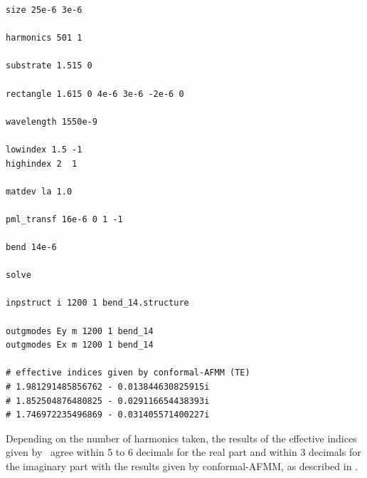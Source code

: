 \begin{lstlisting}
size 25e-6 3e-6

harmonics 501 1

substrate 1.515 0

rectangle 1.615 0 4e-6 3e-6 -2e-6 0

wavelength 1550e-9

lowindex 1.5 -1
highindex 2  1

matdev la 1.0

pml_transf 16e-6 0 1 -1

bend 14e-6

solve

inpstruct i 1200 1 bend_14.structure

outgmodes Ey m 1200 1 bend_14
outgmodes Ex m 1200 1 bend_14

# effective indices given by conformal-AFMM (TE)
# 1.981291485856762 - 0.013844630825915i
# 1.852504876480825 - 0.029116654438393i
# 1.746972235496869 - 0.031405571400227i
\end{lstlisting}

Depending on the number of harmonics taken, the results of the effective indices given by \afmm\ agree within 5 to 6 decimals for the real part and within 3 decimals for the imaginary part with the results given by conformal-AFMM, as described in \cite{martin2009scoi}.

